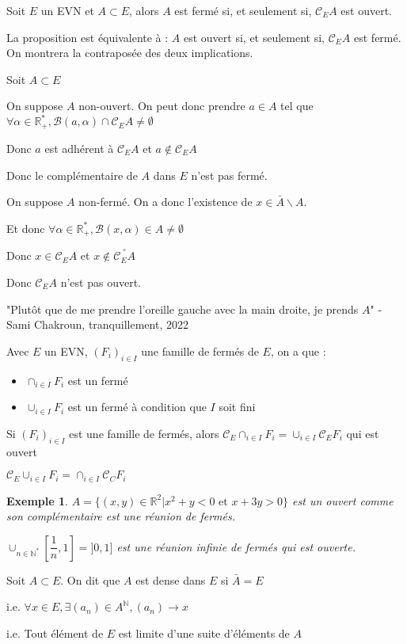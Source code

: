 \documentclass[a4paper,12pt]{book}
\newcommand{\Def}[2]{\begin{tcolorbox}[sharp corners, colback=white,colframe=blue!90!black!75, title=Définition : #1]#2\end{tcolorbox}}
\newcommand{\Thr}[2]{\begin{tcolorbox}[sharp corners, colback=white,colframe=red!90!black!75, title=Théorème : #1]#2\end{tcolorbox}}
\newcommand{\Prop}[2]{\begin{tcolorbox}[sharp corners, colback=white,colframe=red!90!black!75, title=Proposition : #1]#2\end{tcolorbox}}
\newcommand{\Pre}[1]{\begin{tcolorbox}[sharp corners, colback=white,colframe=green!60!green!30!black!75, title=Preuve]#1\end{tcolorbox}}
\newtheorem{Exe}{Exemple}[section]
\def\R{\mathbb{R}}
\def\N{\mathbb{N}}
\begin{document}
\Thr{Complémentarité d'un ouvert}{Soit $E$ un EVN et $A\subset E$, alors $A$ est fermé si, et seulement si, $\mathcal{C}_EA$ est ouvert.}
\Pre{La proposition est équivalente à : $A$ est ouvert si, et seulement si, $\mathcal{C}_EA$ est fermé. On montrera la contraposée des deux implications.
\par Soit $A\subset E$\par On suppose $A$ non-ouvert. On peut donc prendre $a\in A$ tel que $\forall\alpha\in\R_+^*, \mathcal{B}(a,\alpha)\cap \mathcal{C}_EA\neq\emptyset$ \par Donc $a$ est adhérent à $\mathcal{C}_EA$ et $a\notin\mathcal{C}_EA$ \par Donc le complémentaire de $A$ dans $E$ n'est pas fermé.
\par On suppose $A$ non-fermé. On a donc l'existence de $x\in\bar{A}\backslash A$. \par Et donc $\forall \alpha\in\R_+^*,\mathcal{B}(x, \alpha)\in A\neq\emptyset$ \par Donc $x\in\mathcal{C}_EA$ et $x\notin\overset{\circ}{\mathcal{C}_EA}$\par Donc $\mathcal{C}_EA$ n'est pas ouvert.}
"Plutôt que de me prendre l'oreille gauche avec la main droite, je prends $A$" - Sami Chakroun, tranquillement, 2022
\Prop{Réunion et intersection de fermés}{Avec $E$ un EVN, $(F_i)_{i\in I}$ une famille de fermés de $E$, on a que :\begin{itemize}
\item $\cap_{i\in I}F_i$ est un fermé
\item $\cup_{i\in I}F_i$ est un fermé à condition que $I$ soit fini\end{itemize}}
\Pre{Si $(F_i)_{i\in I}$ est une famille de fermés, alors $\mathcal{C}_E\cap_{i\in I}F_i=\cup_{i\in I}\mathcal{C}_EF_i$ qui est ouvert
\par $\mathcal{C}_E\cup_{i\in I}F_i=\cap_{i\in I}\mathcal{C}_CF_i$}
\begin{Exe}
$A=\{(x,y)\in\R^2\vert x^2+y<0\text{ et }x+3y>0\}$ est un ouvert comme son complémentaire est une réunion de fermés.
\par $\cup_{n\in\N^*}\left[\dfrac{1}{n}, 1\right] = ]0,1]$ est une réunion infinie de fermés qui est ouverte.
\end{Exe}
\Def{Densité}{Soit $A\subset E$. On dit que $A$ est dense dans $E$ si $\bar{A}=E$
\par i.e. $\forall x\in E,\exists (a_n)\in A^\N, (a_n)\to x$
\par i.e. Tout élément de $E$ est limite d'une suite d'éléments de $A$}
\end{document}

